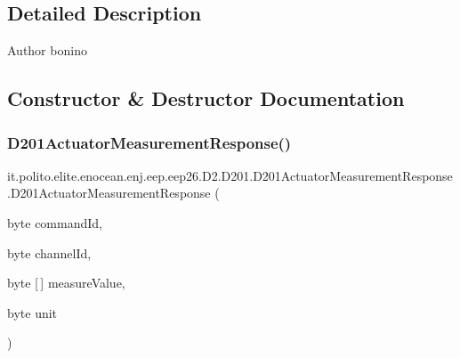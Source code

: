 \subsection{Detailed Description}
\begin{DoxyAuthor}{Author}
bonino 
\end{DoxyAuthor}


\subsection{Constructor \& Destructor Documentation}
\hypertarget{classit_1_1polito_1_1elite_1_1enocean_1_1enj_1_1eep_1_1eep26_1_1_d2_1_1_d201_1_1_d201_actuator_measurement_response_a20227da51cd2cee59969145e22c9ae0e}{}\label{classit_1_1polito_1_1elite_1_1enocean_1_1enj_1_1eep_1_1eep26_1_1_d2_1_1_d201_1_1_d201_actuator_measurement_response_a20227da51cd2cee59969145e22c9ae0e} 
\subsubsection{\texorpdfstring{D201\+Actuator\+Measurement\+Response()}{D201ActuatorMeasurementResponse()}}
{\footnotesize\ttfamily it.\+polito.\+elite.\+enocean.\+enj.\+eep.\+eep26.\+D2.\+D201.\+D201\+Actuator\+Measurement\+Response.\+D201\+Actuator\+Measurement\+Response (\begin{DoxyParamCaption}\item[{byte}]{command\+Id,  }\item[{byte}]{channel\+Id,  }\item[{byte \mbox{[}$\,$\mbox{]}}]{measure\+Value,  }\item[{byte}]{unit }\end{DoxyParamCaption})}



